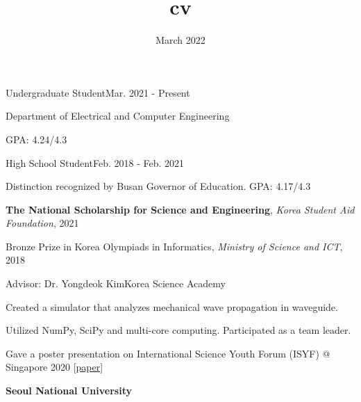 \documentclass{cv}
\title{cv}
\date{March 2022}
\begin{document}
\cvheader






{Undergraduate Student}{Mar. 2021 - Present}
{
    \item Department of Electrical and Computer Engineering
    \item GPA: 4.24/4.3
}
{High School Student}{Feb. 2018 - Feb. 2021}
{
    \item Distinction recognized by Busan Governor of Education. GPA: 4.17/4.3
}



\textbf{The National Scholarship for Science and Engineering}, \textit{Korea Student Aid Foundation}, 2021

Bronze Prize in Korea Olympiads in Informatics, \textit{Ministry of Science and ICT}, 2018

{Advisor: Dr. Yongdeok Kim}{Korea Science Academy}
{
    \item Created a simulator that analyzes mechanical wave propagation in waveguide.
    \item Utilized NumPy, SciPy and multi-core computing. Participated as a team leader.
    \item Gave a poster presentation on International Science Youth Forum (ISYF) @ Singapore 2020 [\href{https://research.ksa.hs.kr/2019RNE_MAT02}{paper}]
}





\textbf{Seoul National University}
\end{document}
